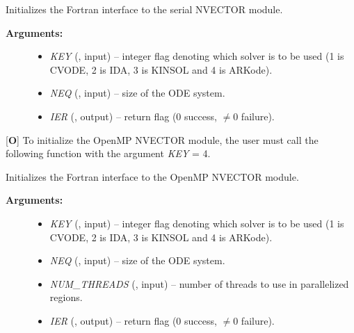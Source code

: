 \documentclass[letterpaper,10pt,english]{sphinxmanual}
\begin{document}
\begin{fulllineitems}
\label{f_interface/Usage:f/_/FNVINITS}
Initializes the Fortran interface to the serial NVECTOR module.
\begin{description}
\item[{\textbf{Arguments:}}] \leavevmode\begin{itemize}
\item {} 
\emph{KEY} (, input) -- integer flag denoting which solver
is to be used (1 is CVODE, 2 is IDA, 3 is KINSOL and 4 is ARKode).

\item {} 
\emph{NEQ} (, input) -- size of the ODE system.

\item {} 
\emph{IER} (, output) -- return flag (0 success, $\ne 0$ failure).

\end{itemize}

\end{description}

\end{fulllineitems}


{[}\textbf{O}{]} To initialize the OpenMP NVECTOR module, the user must
call the following function with the argument \emph{KEY} = 4.

\begin{fulllineitems}
\label{f_interface/Usage:f/_/FNVINITS_OPENMP}
Initializes the Fortran interface to the OpenMP NVECTOR module.
\begin{description}
\item[{\textbf{Arguments:}}] \leavevmode\begin{itemize}
\item {} 
\emph{KEY} (, input) -- integer flag denoting which solver
is to be used (1 is CVODE, 2 is IDA, 3 is KINSOL and 4 is ARKode).

\item {} 
\emph{NEQ} (, input) -- size of the ODE system.

\item {} 
\emph{NUM\_THREADS} (, input) -- number of threads to use in
parallelized regions.

\item {} 
\emph{IER} (, output) -- return flag (0 success, $\ne 0$ failure).

\end{itemize}

\end{description}

\end{fulllineitems}
\end{document}
